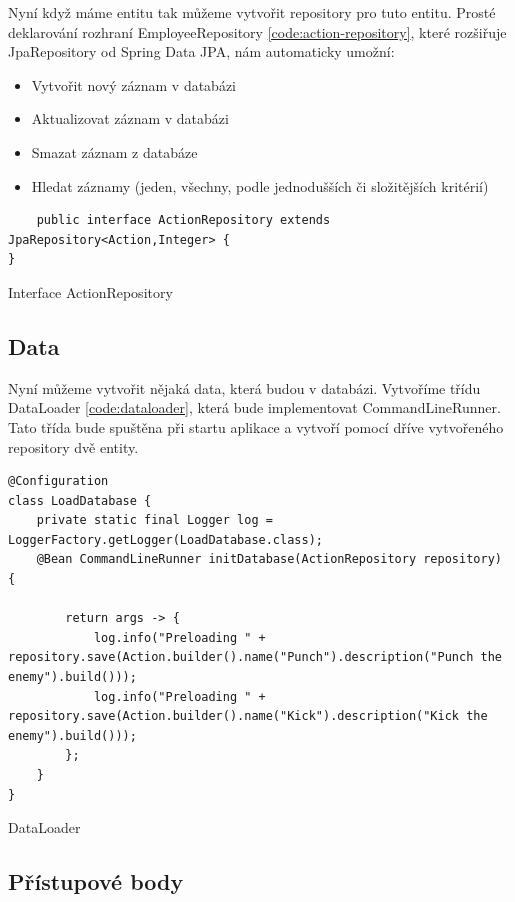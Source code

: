Nyní když máme entitu tak můžeme vytvořit repository pro tuto entitu. Prosté deklarování rozhraní EmployeeRepository \ref{code:action-repository}, které rozšiřuje JpaRepository od Spring Data JPA, nám automaticky umožní:
\begin{itemize}
    \item Vytvořit nový záznam v databázi
    \item Aktualizovat záznam v databázi
    \item Smazat záznam z databáze
    \item Hledat záznamy (jeden, všechny, podle jednodušších či složitějších kritérií)
\end{itemize}

\begin{listing}[H]
    \begin{verbatim}
    public interface ActionRepository extends JpaRepository<Action,Integer> {
}
    \end{verbatim}
    \caption{Interface ActionRepository}
    \label{code:action-repository}
\end{listing}


\subsection*{Data}
Nyní můžeme vytvořit nějaká data, která budou v databázi. Vytvoříme třídu DataLoader \ref{code:dataloader}, která bude implementovat CommandLineRunner. Tato třída bude spuštěna při startu aplikace a vytvoří pomocí dříve vytvořeného repository dvě entity.

\begin{listing}[H]
    \begin{verbatim}
@Configuration
class LoadDatabase {
    private static final Logger log = LoggerFactory.getLogger(LoadDatabase.class);
    @Bean CommandLineRunner initDatabase(ActionRepository repository) {

        return args -> {
            log.info("Preloading " + repository.save(Action.builder().name("Punch").description("Punch the enemy").build()));
            log.info("Preloading " + repository.save(Action.builder().name("Kick").description("Kick the enemy").build()));
        };
    }
}
    \end{verbatim}
    \caption{DataLoader}
    \label{code:dataloader}
\end{listing}

\subsection{Přístupové body}

